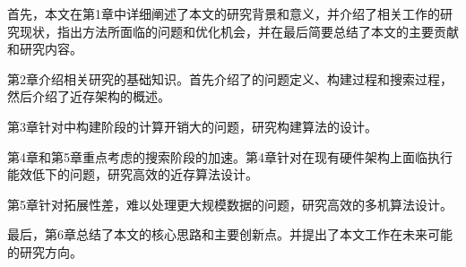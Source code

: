 首先，本文在第1章中详细阐述了本文的研究背景和意义，并介绍了相关工作的研究现状，指出\ganns 方法所面临的问题和优化机会，并在最后简要总结了本文的主要贡献和研究内容。

第2章介绍相关研究的基础知识。首先介绍了\ganns 的问题定义、构建过程和搜索过程，然后介绍了近存架构的概述。

第3章针对\ganns 中构建阶段的计算开销大的问题，研究构建算法的设计。

第4章和第5章重点考虑\ganns 的搜索阶段的加速。第4章针对\ganns 在现有硬件架构上面临执行能效低下的问题，研究高效的近存算法设计。

第5章针对\ganns 拓展性差，难以处理更大规模数据的问题，研究高效的多机算法设计。

最后，第6章总结了本文的核心思路和主要创新点。并提出了本文工作在未来可能的研究方向。